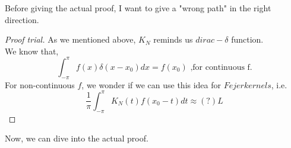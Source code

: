 \documentclass[12pt]{amsart}
\theoremstyle{definition}
\begin{document}
Before giving the actual proof, I want to give a "wrong path" in the right direction.


\begin{proof}[Proof trial]
    {As we mentioned above, $K_N$ reminds us $dirac-\delta$ function.}\\
   { We know that,}
    \[
    \int_{-\pi}^{\pi}f(x)\delta(x - x_0)dx = f(x_0) \text{  ,for continuous f.}
    \]
    For non-continuous \(f\), we wonder if we can use this idea for $Fejer kernels$, i.e.
    \[
    \frac{1}{\pi}\int_{-\pi}^{\pi} K_N(t)f(x_0 - t)dt \approx(?) L
    \]\footnotemark{}
\end{proof}


Now, we can dive into the actual proof.
\end{document}
